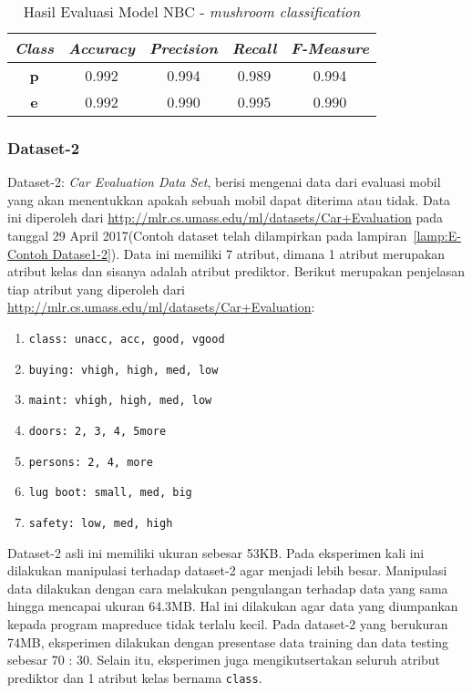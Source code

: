 \begin{table}[H]
\label{tab:model evaluation - mushroom}
\centering
\caption{Hasil Evaluasi Model NBC - \textit{mushroom classification}}
\begin{tabular}{ | c | c | c | c | c | }
\hline
\textit{\textbf{Class}} & \textit{\textbf{Accuracy}} & \textit{\textbf{Precision}} & \textit{\textbf{Recall}} & \textit{\textbf{F-Measure}}\\ \hline \hline
\textbf{p} & 0.992 & 0.994 & 0.989 & 0.994 \\ \hline
\textbf{e} & 0.992 & 0.990 & 0.995 & 0.990 \\ \hline
\end{tabular}
\end{table}

\subsubsection{Dataset-2}

Dataset-2: \textit{Car Evaluation Data Set}, berisi mengenai data dari evaluasi mobil yang akan menentukkan apakah sebuah mobil dapat diterima atau tidak. Data ini diperoleh dari \url{http://mlr.cs.umass.edu/ml/datasets/Car+Evaluation} pada tanggal 29 April 2017(Contoh dataset telah dilampirkan pada lampiran~\ref{lamp:E-Contoh Datase1-2}). Data ini memiliki 7 atribut, dimana 1 atribut merupakan atribut kelas dan sisanya adalah atribut prediktor. Berikut merupakan penjelasan tiap atribut yang diperoleh dari \url{http://mlr.cs.umass.edu/ml/datasets/Car+Evaluation}:
\begin{enumerate}
	\item \texttt{class: unacc, acc, good, vgood }
	\item \texttt{buying: vhigh, high, med, low}
	\item \texttt{maint: vhigh, high, med, low}
	\item \texttt{doors: 2, 3, 4, 5more}
	\item \texttt{persons: 2, 4, more} 
	\item \texttt{lug boot: small, med, big}
	\item \texttt{safety: low, med, high}
\end{enumerate}

Dataset-2 asli ini memiliki ukuran sebesar 53KB. Pada eksperimen kali ini dilakukan manipulasi terhadap dataset-2 agar menjadi lebih besar. Manipulasi data dilakukan dengan cara melakukan pengulangan terhadap data yang sama hingga mencapai ukuran 64.3MB. Hal ini dilakukan agar data yang diumpankan kepada program mapreduce tidak terlalu kecil. Pada dataset-2 yang berukuran 74MB, eksperimen dilakukan dengan presentase data training dan data testing sebesar 70 : 30. Selain itu, eksperimen juga mengikutsertakan seluruh atribut prediktor dan 1 atribut kelas bernama \texttt{class}.


